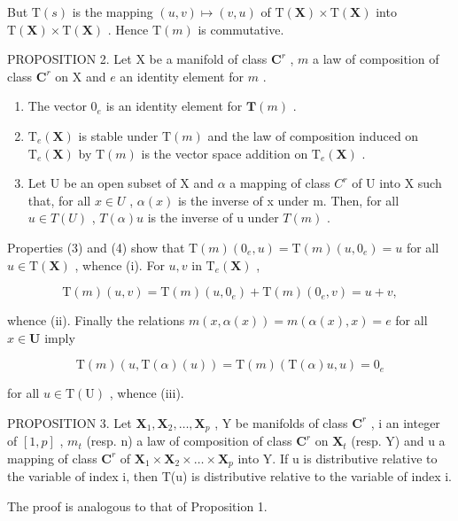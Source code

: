But \(\mathrm{T}(s)\) is the mapping \((u,v)\mapsto (v,u)\) of \(\mathrm{T}(\mathbf{X})\times \mathrm{T}(\mathbf{X})\) into \(\mathrm{T}(\mathbf{X})\times \mathrm{T}(\mathbf{X})\) . Hence \(\mathrm{T}(m)\) is commutative.

PROPOSITION 2. Let X be a manifold of class \(\mathbf{C}^r\) , \(m\) a law of composition of class \(\mathbf{C}^r\) on X and \(e\) an identity element for \(m\) .

\begin{enumerate}
\def\labelenumi{(\roman{enumi})}
\item
  The vector \(0_{e}\) is an identity element for \(\mathbf{T}(m)\) .
\item
  \(\mathrm{T}_{e}(\mathbf{X})\) is stable under \(\mathrm{T}(m)\) and the law of composition induced on \(\mathrm{T}_{e}(\mathbf{X})\) by \(\mathrm{T}(m)\) is the vector space addition on \(\mathrm{T}_{e}(\mathbf{X})\) .
\item
  Let U be an open subset of X and \(\alpha\) a mapping of class \(C^{r}\) of U into X such that, for all \(x \in U\) , \(\alpha(x)\) is the inverse of x under m. Then, for all \(u \in T(U)\) , \(T(\alpha)u\) is the inverse of u under \(T(m)\) .
\end{enumerate}

Properties (3) and (4) show that \(\mathrm{T}(m)(0_e,u) = \mathrm{T}(m)(u,0_e) = u\) for all \(u\in \mathrm{T}(\mathbf{X})\) , whence (i). For \(u,v\) in \(\mathrm{T}_e(\mathbf{X})\) ,

\[
\mathrm{T} (m) (u, v) = \mathrm{T} (m) (u, 0 _ {e}) + \mathrm{T} (m) (0 _ {e}, v) = u + v,
\]

whence (ii). Finally the relations \(m(x, \alpha(x)) = m(\alpha(x), x) = e\) for all \(x \in \mathbf{U}\) imply

\[
\mathrm{T} (m) (u, \mathrm{T} (\alpha) (u)) = \mathrm{T} (m) (\mathrm{T} (\alpha) u, u) = 0 _ {e}
\]

for all \(u \in \mathrm{T}(\mathrm{U})\) , whence (iii).

PROPOSITION 3. Let \(\mathbf{X}_1, \mathbf{X}_2, \ldots, \mathbf{X}_p\) , Y be manifolds of class \(\mathbf{C}^r\) , i an integer of \([1, p]\) , \(m_t\) (resp. n) a law of composition of class \(\mathbf{C}^r\) on \(\mathbf{X}_t\) (resp. Y) and u a mapping of class \(\mathbf{C}^r\) of \(\mathbf{X}_1 \times \mathbf{X}_2 \times \dots \times \mathbf{X}_p\) into Y. If u is distributive relative to the variable of index i, then T(u) is distributive relative to the variable of index i.

The proof is analogous to that of Proposition 1.

